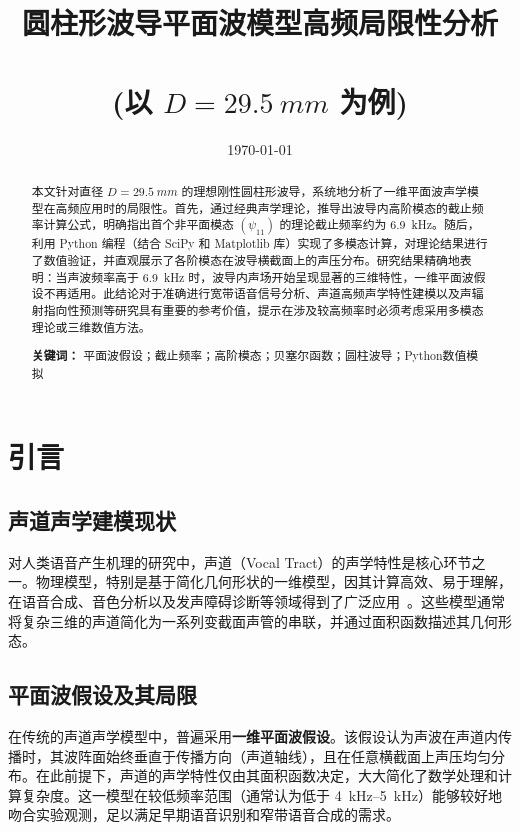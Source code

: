 \documentclass[12pt,a4paper]{article}
\title{圆柱形波导平面波模型高频局限性分析 \\\\ (以 $D=\SI{29.5}{mm}$ 为例)}
\author{ } %
\date{\today}
\begin{document}
\maketitle

\begin{abstract}
\leavevmode 本文针对直径 $D=\SI{29.5}{mm}$ 的理想刚性圆柱形波导，系统地分析了一维平面波声学模型在高频应用时的局限性。首先，通过经典声学理论，推导出波导内高阶模态的截止频率计算公式，明确指出首个非平面模态 $(\psi_{11})$ 的理论截止频率约为 \SI{6.9}{kHz}。随后，利用 Python 编程（结合 SciPy 和 Matplotlib 库）实现了多模态计算，对理论结果进行了数值验证，并直观展示了各阶模态在波导横截面上的声压分布。研究结果精确地表明：当声波频率高于 \SI{6.9}{kHz} 时，波导内声场开始呈现显著的三维特性，一维平面波假设不再适用。此结论对于准确进行宽带语音信号分析、声道高频声学特性建模以及声辐射指向性预测等研究具有重要的参考价值，提示在涉及较高频率时必须考虑采用多模态理论或三维数值方法。\par
\vspace{1em}
\textbf{关键词：} 平面波假设；截止频率；高阶模态；贝塞尔函数；圆柱波导；Python数值模拟
\end{abstract}

\tableofcontents
\newpage

\section{引言}

\subsection{声道声学建模现状}
对人类语音产生机理的研究中，声道（Vocal Tract）的声学特性是核心环节之一。物理模型，特别是基于简化几何形状的一维模型，因其计算高效、易于理解，在语音合成、音色分析以及发声障碍诊断等领域得到了广泛应用~\cite{bib:Story1996, bib:Fant1960}。这些模型通常将复杂三维的声道简化为一系列变截面声管的串联，并通过面积函数描述其几何形态。

\subsection{平面波假设及其局限}
在传统的声道声学模型中，普遍采用\textbf{一维平面波假设}。该假设认为声波在声道内传播时，其波阵面始终垂直于传播方向（声道轴线），且在任意横截面上声压均匀分布。在此前提下，声道的声学特性仅由其面积函数决定，大大简化了数学处理和计算复杂度。这一模型在较低频率范围（通常认为低于 \SIrange{4}{5}{\kilo\hertz}）能够较好地吻合实验观测，足以满足早期语音识别和窄带语音合成的需求。
\end{document}
